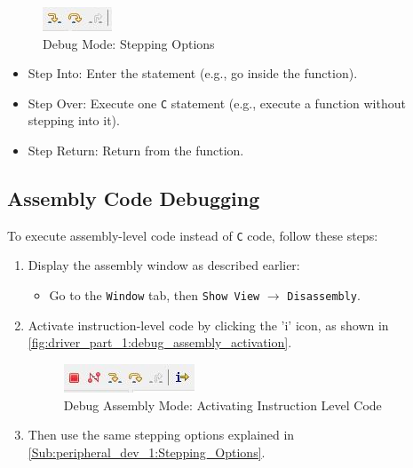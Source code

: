 \begin{figure}[h]
\centering
\includegraphics[scale=0.9]{Figures/driver_part_1/debug_stepping_options}
\caption{Debug Mode: Stepping Options}
\label{fig:driver_part_1:debug_stepping_options}
\end{figure}

\begin{itemize}
    \item Step Into: Enter the statement (e.g., go inside the function).

    \item Step Over: Execute one \verb|C| statement (e.g., execute a function without stepping into it).

    \item Step Return: Return from the function.
  
\end{itemize}


\subsection{Assembly Code Debugging}

To execute assembly-level code instead of \verb|C| code, follow these steps:

\begin{enumerate}
    \item Display the assembly window as described earlier:

    \begin{itemize}
        \item Go to the \verb|Window| tab, then \verb|Show View| $\rightarrow$ \verb|Disassembly|.
    \end{itemize}

    \item Activate instruction-level code by clicking the 'i' icon, as shown in \autoref{fig:driver_part_1:debug_assembly_activation}.

\begin{figure}[h]
\centering
\includegraphics[scale=0.9]{Figures/driver_part_1/debug_assembly_activation}
\caption{Debug Assembly Mode: Activating Instruction Level Code}
\label{fig:driver_part_1:debug_assembly_activation}
\end{figure}

\item Then use the same stepping options explained in \ref{Sub:peripheral_dev_1:Stepping_Options}.
    
\end{enumerate}

